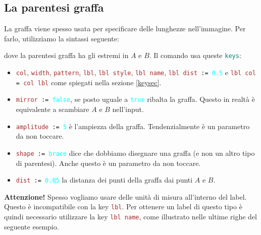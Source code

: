 \documentclass[italian, a4paper]{article}
\newcommand{\bs}{\textbackslash}
\newcommand{\ttt}[1]{\texttt{#1}}
\newcommand{\codice}[2][\large]{\vspace*{1mm}\noindent\fbox{\parbox{\textwidth}{#1\ttt{#2}}}}
\newcommand{\blue}[1]{\textcolor{blue}{#1}}
\newcommand{\cyan}[1]{\textcolor{cyan}{#1}}
\newcommand{\keys}{\textcolor{teal}{\ttt{keys}}}
\newcommand{\key}[1]{\textcolor{brown}{\ttt{#1}}}
\newcommand{\keyval}[1]{\cyan{\ttt{#1}}}
\begin{document}
\subsection{La parentesi graffa}
La graffa viene spesso usata per specificare delle lunghezze nell'immagine. Per farlo, utilizziamo la sintassi seguente:

\codice{\bs graffa[\keys]\{\blue{$A$}\}\{\blue{$B$}\};}
dove la parentesi graffa ha gli estremi in $A$ e $B$. Il comando usa queste \keys:
\begin{itemize}[nolistsep]
\item \key{col}, \key{width}, \key{pattern}, \key{lbl}, \key{lbl style}, \key{lbl name}, \ttt{\key{lbl dist} := \keyval{0.5}} e \ttt{\key{lbl col} = \key{col lbl}} come spiegati nella sezione \ref{keysec}.
\item \ttt{\key{mirror} := \keyval{false}}, se posto uguale a \keyval{true} ribalta la graffa. Questo in realtà è equivalente a scambiare $A$ e $B$ nell'input.
\item \ttt{\key{amplitude} := \keyval{5}} è l'ampiezza della graffa. Tendenzialmente è un parametro da non toccare.
\item \ttt{\key{shape} := \keyval{brace}} dice che dobbiamo disegnare una graffa (e non un altro tipo di parentesi). Anche questo è un parametro da non toccare.
\item \ttt{\key{dist} := \keyval{0.05}} la distanza dei punti della graffa dai punti $A$ e $B$.
\end{itemize}

\textbf{Attenzione!} Spesso vogliamo usare delle unità di misura all'interno del label. Questo è incompatibile con la key \key{lbl}. Per ottenere un label di questo tipo è quindi necessario utilizzare la key \key{lbl name}, come illustrato nelle ultime righe del seguente esempio.
\end{document}
